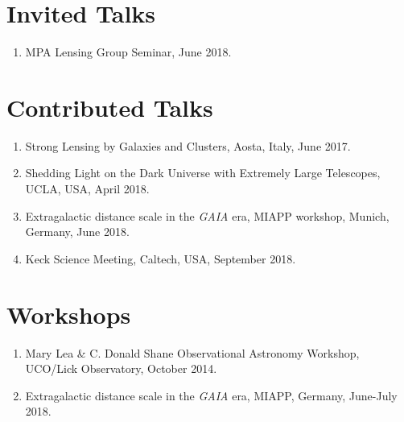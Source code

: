 \documentclass[margin,line]{res}
\begin{document}
\begin{resume}
\section{\sc Invited Talks}
\begin{enumerate}
	\item MPA Lensing Group Seminar, June 2018.
\end{enumerate}


\section{\sc Contributed Talks}
\begin{enumerate}
	\item Strong Lensing by Galaxies and Clusters, Aosta, Italy, June 2017.
	\item Shedding Light on the Dark Universe with Extremely Large Telescopes, UCLA, USA, April 2018.
	\item Extragalactic distance scale in the \textit{GAIA} era, MIAPP workshop, Munich, Germany, June 2018.
	\item Keck Science Meeting, Caltech, USA, September 2018.
\end{enumerate}


\section{\sc Workshops}
\begin{enumerate}
	\item Mary Lea \& C. Donald Shane Observational Astronomy Workshop, UCO/Lick Observatory, October 2014.
	\item Extragalactic distance scale in the \textit{GAIA} era, MIAPP, Germany, June-July 2018.
\end{enumerate}


%



\end{resume}
\end{document}
